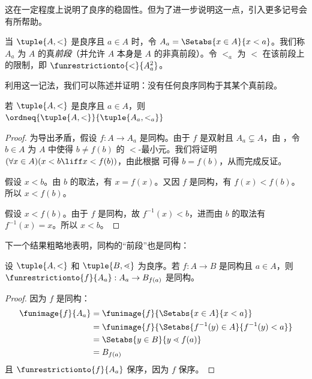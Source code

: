 \documentclass[../../../include/open-logic-section]{subfiles}
\begin{document}
\noindent
这在一定程度上说明了良序的稳固性。但为了进一步说明这一点，引入更多记号会有所帮助。

\begin{defn}
当 $\tuple{A, <}$ 是良序且 $a \in A$ 时，令 $A_a = \Setabs{x \in A}{x
< a}$。我们称 $A_a$ 为 $A$ 的真\emph{前段}（并允许 $A$ 本身是 $A$ 的非真前段）。令 $<_a$ 为 $<$ 在该前段上的限制，即 $\funrestrictionto{\mathord{<}}{A_a^2}$。
\end{defn}

\noindent
利用这一记法，我们可以陈述并证明：没有任何良序同构于其某个真前段。

\begin{lem}
若 $\tuple{A, <}$ 是良序且 $a \in A$，则 $\ordneq{\tuple{A, <}}{\tuple{A_a, <_a}}$
\end{lem}

\begin{proof}
为导出矛盾，假设 $f \colon A \to A_a$ 是同构。由于 $f$ 是双射且 $A_a \subsetneq A$，由 ，令 $b \in A$ 为 $A$ 中使得 $b \neq f(b)$ 的 $<$-最小元。我们将证明 $(\forall x \in A)(x<b \liff x < f(b))$，由此根据  可得 $b = f(b)$，从而完成反证。

假设 $x < b$。由 $b$ 的取法，有 $x = f(x)$。又因 $f$ 是同构，有 $f(x) < f(b)$。所以 $x < f(b)$。

假设 $x < f(b)$。由于 $f$ 是同构，故 $f^{-1}(x) < b$，进而由 $b$ 的取法有 $f^{-1}(x) = x$。所以 $x < b$。
\end{proof}

下一个结果粗略地表明，同构的“前段”也是同构：

\begin{lem}
设 $\tuple{A, <}$ 和 $\tuple{B, \lessdot}$ 为良序。若 $f \colon A \to B$ 是同构且 $a \in A$，则 $\funrestrictionto{f}{A_{a}} : A_a \to B_{f(a)}$ 是同构。
\end{lem}

\begin{proof}
因为 $f$ 是同构：
\begin{align*}
	\funimage{f}{A_a} &= \funimage{f}{\Setabs{x \in A}{x < a}}\\
	&= \funimage{f}{\Setabs{f^{-1}(y) \in A}{f^{-1}(y) < a}} \\
	&= \Setabs{y \in B}{y \lessdot f(a)} \\
	&=B_{f(a)}
\end{align*}
且 $\funrestrictionto{f}{A_a}$ 保序，因为 $f$ 保序。
\end{proof}
\end{document}
